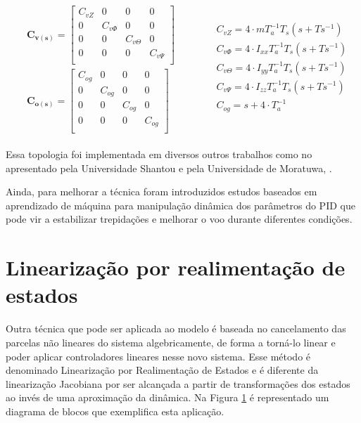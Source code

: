 \documentclass[main.tex]{subfiles}
\begin{document}
\begin{equation}\label{eq:pid_multivariavel}
	\begin{matrix}
		\begin{split}
			&\boldsymbol{C_{v(s)}} = \begin{bmatrix}
				C_{vZ} & 0 & 0 & 0\\
				0 & C_{v\Phi} & 0 & 0\\
				0 & 0 & C_{v\Theta} & 0\\
				0 & 0 & 0 & C_{v\Psi}\\
			\end{bmatrix}\\
			&\boldsymbol{C_{o(s)}} = \begin{bmatrix}
				C_{og} & 0 & 0 & 0\\
				0 & C_{og} & 0 & 0\\
				0 & 0 & C_{og} & 0\\
				0 & 0 & 0 & C_{og}\\
			\end{bmatrix}\hspace{1cm}
		\end{split}&
		\begin{split}
			&C_{vZ} = 4\cdot m T_a^{-1} T_s(s + Ts^{-1})\\
			&C_{v\Phi} = 4\cdot I_{xx} T_a^{-1} T_s(s + Ts^{-1})\\
			&C_{v\Theta} = 4\cdot I_{yy} T_a^{-1} T_s(s + Ts^{-1})\\
			&C_{v\Psi} = 4\cdot I_{zz} T_a^{-1} T_s(s + Ts^{-1})\\
			&C_{og} = s + 4\cdot{T_a^{-1}}\\
		\end{split}
		
	\end{matrix}
\end{equation}

Essa topologia foi implementada em diversos outros trabalhos como no apresentado pela Universidade Shantou \cite{controle:pid} e pela Universidade de Moratuwa, \cite{controle:pid_modelagem_basica}. 

Ainda, para melhorar a técnica foram introduzidos estudos baseados em aprendizado de máquina \cite{controle:pid-aprendizado-maquina} para manipulação dinâmica dos parâmetros do PID que pode vir a estabilizar trepidações e melhorar o voo durante diferentes condições.

\section{Linearização por realimentação de estados}

Outra técnica que pode ser aplicada ao modelo é baseada no cancelamento das parcelas não lineares do sistema algebricamente, de forma a torná-lo linear e poder aplicar controladores lineares nesse novo sistema. Esse método é denominado Linearização por Realimentação de Estados \cite{slotine} e é diferente da linearização Jacobiana por ser alcançada a partir de transformações dos estados ao invés de uma aproximação da dinâmica. Na Figura \ref{} é representado um diagrama de blocos que exemplifica esta aplicação.
\end{document}
